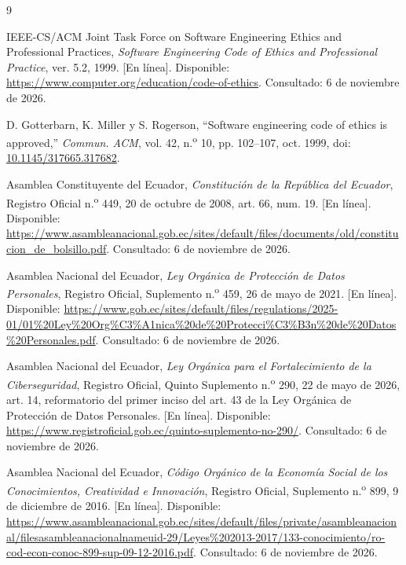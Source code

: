 \documentclass[12pt,a4paper,oneside]{article}
\begin{document}
\clearpage
{}
\renewcommand{\refname}{Referencias bibliográficas}
\begin{thebibliography}{9}

IEEE-CS/ACM Joint Task Force on Software Engineering Ethics and Professional Practices,
\emph{Software Engineering Code of Ethics and Professional Practice}, ver. 5.2, 1999.
[En l\'inea]. Disponible: \url{https://www.computer.org/education/code-of-ethics}.
Consultado: 6 de noviembre de 2026.

D. Gotterbarn, K. Miller y S. Rogerson,
``Software engineering code of ethics is approved,''
\emph{Commun. ACM}, vol. 42, n.\textsuperscript{o} 10, pp. 102--107, oct. 1999,
doi: \href{https://doi.org/10.1145/317665.317682}{10.1145/317665.317682}.

Asamblea Constituyente del Ecuador,
\emph{Constituci\'on de la Rep\'ublica del Ecuador},
Registro Oficial n.\textsuperscript{o} 449, 20 de octubre de 2008, art. 66, num. 19.
[En l\'inea]. Disponible: \url{https://www.asambleanacional.gob.ec/sites/default/files/documents/old/constitucion_de_bolsillo.pdf}.
Consultado: 6 de noviembre de 2026.

Asamblea Nacional del Ecuador,
\emph{Ley Org\'anica de Protecci\'on de Datos Personales},
Registro Oficial, Suplemento n.\textsuperscript{o} 459, 26 de mayo de 2021.
[En l\'inea]. Disponible: \url{https://www.gob.ec/sites/default/files/regulations/2025-01/01%20Ley%20Org%C3%A1nica%20de%20Protecci%C3%B3n%20de%20Datos%20Personales.pdf}.
Consultado: 6 de noviembre de 2026.

Asamblea Nacional del Ecuador,
\emph{Ley Org\'anica para el Fortalecimiento de la Ciberseguridad},
Registro Oficial, Quinto Suplemento n.\textsuperscript{o} 290, 22 de mayo de 2026,
art. 14, reformatorio del primer inciso del art. 43 de la Ley Org\'anica de Protecci\'on de Datos Personales.
[En l\'inea]. Disponible: \url{https://www.registroficial.gob.ec/quinto-suplemento-no-290/}.
Consultado: 6 de noviembre de 2026.

Asamblea Nacional del Ecuador,
\emph{C\'odigo Org\'anico de la Econom\'ia Social de los Conocimientos, Creatividad e Innovaci\'on},
Registro Oficial, Suplemento n.\textsuperscript{o} 899, 9 de diciembre de 2016.
[En l\'inea]. Disponible: \url{https://www.asambleanacional.gob.ec/sites/default/files/private/asambleanacional/filesasambleanacionalnameuid-29/Leyes%202013-2017/133-conocimiento/ro-cod-econ-conoc-899-sup-09-12-2016.pdf}.
Consultado: 6 de noviembre de 2026.


\end{thebibliography}
\end{document}
